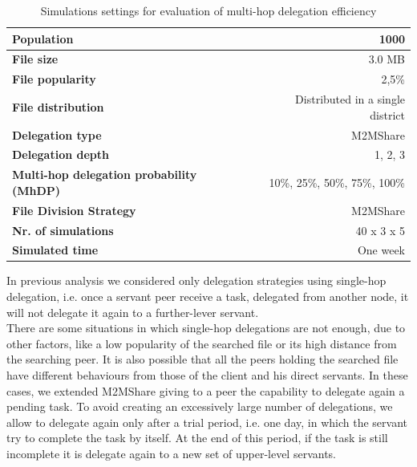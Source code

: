 \begin{table}[h]
\begin{center}
\begin{tabular}{|l|r|}
\hline
\bfseries Population & 1000 \\
\hline
\bfseries File size & 3.0 MB \\
\hline
\bfseries File popularity & 2,5\% \\
\hline
\bfseries File distribution & Distributed in a single district \\
\hline
\bfseries Delegation type & M2MShare\\
\hline
\bfseries Delegation depth & 1, 2, 3 \\
\hline
\bfseries Multi-hop delegation probability (MhDP) & 10\%, 25\%, 50\%, 75\%, 100\% \\
\hline
\bfseries File Division Strategy & M2MShare \\
\hline
\bfseries Nr. of simulations & 40 x 3 x 5\\
\hline
\bfseries Simulated time & One week \\
\hline
\end{tabular}
\end{center}
\caption{Simulations settings for evaluation of multi-hop delegation efficiency\label{tab:settingsMultiHop}}
\end{table}
In previous analysis we considered only delegation strategies using single-hop delegation, i.e. once a servant peer receive a task, delegated from another node, it will not delegate it again to a further-lever servant. 
\\

There are some situations in which single-hop delegations are not enough, due to other factors, like a low popularity of the searched file or its high distance from the searching peer. It is also possible that all the peers holding the searched file have different behaviours from those of the client and his direct servants. In these cases, we extended M2MShare giving to a peer the capability to delegate again a pending task. To avoid creating an excessively large number of delegations, we allow to delegate again only after a trial period, i.e. one day, in which the servant try to complete the task by itself. At the end of this period, if the task is still incomplete it is delegate again to a new set of upper-level servants.
\\

